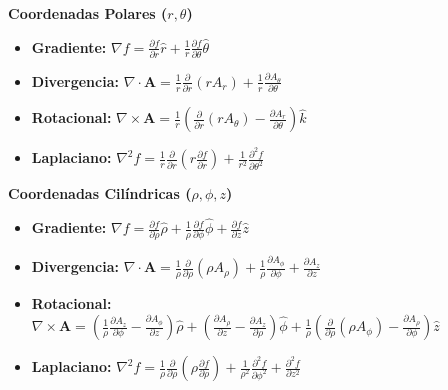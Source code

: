 \documentclass[10pt, landscape, twocolumn]{article}
\newcommand{\cheatsheetsubsection}[1]{
    \vspace{0.5em}
    {\color{themeblue}\normalsize\bfseries #1} \par
    \vspace{0.2em}
}
\begin{document}
\cheatsheetsubsection{Coordenadas Polares ($r, \theta$)}
\begin{itemize}[leftmargin=*, nosep]
    \item \textbf{Gradiente:} $\nabla f = \frac{\partial f}{\partial r}\hat{r} + \frac{1}{r}\frac{\partial f}{\partial \theta}\hat{\theta}$
    \item \textbf{Divergencia:} $\nabla \cdot \mathbf{A} = \frac{1}{r}\frac{\partial}{\partial r}(r A_r) + \frac{1}{r}\frac{\partial A_\theta}{\partial \theta}$
    \item \textbf{Rotacional:} $\nabla \times \mathbf{A} = \frac{1}{r}\left( \frac{\partial}{\partial r}(r A_\theta) - \frac{\partial A_r}{\partial \theta} \right)\hat{k}$
    \item \textbf{Laplaciano:} $\nabla^2 f = \frac{1}{r}\frac{\partial}{\partial r}\left(r \frac{\partial f}{\partial r}\right) + \frac{1}{r^2}\frac{\partial^2 f}{\partial \theta^2}$
\end{itemize}

\cheatsheetsubsection{Coordenadas Cilíndricas ($\rho, \phi, z$)}
\begin{itemize}[leftmargin=*, nosep]
    \item \textbf{Gradiente:} $\nabla f = \frac{\partial f}{\partial \rho}\hat{\rho} + \frac{1}{\rho}\frac{\partial f}{\partial \phi}\hat{\phi} + \frac{\partial f}{\partial z}\hat{z}$
    \item \textbf{Divergencia:} $\nabla \cdot \mathbf{A} = \frac{1}{\rho}\frac{\partial}{\partial \rho}(\rho A_\rho) + \frac{1}{\rho}\frac{\partial A_\phi}{\partial \phi} + \frac{\partial A_z}{\partial z}$
    \item \textbf{Rotacional:} $\nabla \times \mathbf{A} = \left( \frac{1}{\rho}\frac{\partial A_z}{\partial \phi} - \frac{\partial A_\phi}{\partial z} \right)\hat{\rho} + \left( \frac{\partial A_\rho}{\partial z} - \frac{\partial A_z}{\partial \rho} \right)\hat{\phi} + \frac{1}{\rho}\left( \frac{\partial}{\partial \rho}(\rho A_\phi) - \frac{\partial A_\rho}{\partial \phi} \right)\hat{z}$
    \item \textbf{Laplaciano:} $\nabla^2 f = \frac{1}{\rho}\frac{\partial}{\partial \rho}\left(\rho \frac{\partial f}{\partial \rho}\right) + \frac{1}{\rho^2}\frac{\partial^2 f}{\partial \phi^2} + \frac{\partial^2 f}{\partial z^2}$
\end{itemize}
\end{document}

